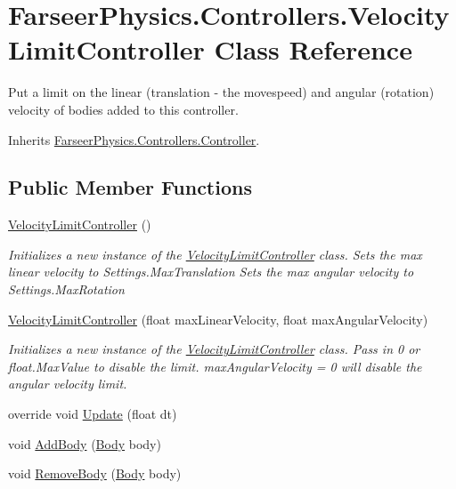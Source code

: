 \hypertarget{class_farseer_physics_1_1_controllers_1_1_velocity_limit_controller}{\section{Farseer\+Physics.\+Controllers.\+Velocity\+Limit\+Controller Class Reference}
\label{class_farseer_physics_1_1_controllers_1_1_velocity_limit_controller}
}


Put a limit on the linear (translation -\/ the movespeed) and angular (rotation) velocity of bodies added to this controller.  




Inherits \hyperlink{class_farseer_physics_1_1_controllers_1_1_controller}{Farseer\+Physics.\+Controllers.\+Controller}.

\subsection*{Public Member Functions}
\begin{DoxyCompactItemize}
\item 
\hyperlink{class_farseer_physics_1_1_controllers_1_1_velocity_limit_controller_a01861100f75c7b55cbdabd5a36872f6f}{Velocity\+Limit\+Controller} ()
\begin{DoxyCompactList}\small\item\em Initializes a new instance of the \hyperlink{class_farseer_physics_1_1_controllers_1_1_velocity_limit_controller}{Velocity\+Limit\+Controller} class. Sets the max linear velocity to Settings.\+Max\+Translation Sets the max angular velocity to Settings.\+Max\+Rotation \end{DoxyCompactList}\item 
\hyperlink{class_farseer_physics_1_1_controllers_1_1_velocity_limit_controller_a2a34ee3ebd6b1c47ad0548a6a7513d9c}{Velocity\+Limit\+Controller} (float max\+Linear\+Velocity, float max\+Angular\+Velocity)
\begin{DoxyCompactList}\small\item\em Initializes a new instance of the \hyperlink{class_farseer_physics_1_1_controllers_1_1_velocity_limit_controller}{Velocity\+Limit\+Controller} class. Pass in 0 or float.\+Max\+Value to disable the limit. max\+Angular\+Velocity = 0 will disable the angular velocity limit. \end{DoxyCompactList}\item 
override void \hyperlink{class_farseer_physics_1_1_controllers_1_1_velocity_limit_controller_a9f06aad10ab9cd87954d9426a8a29a84}{Update} (float dt)
\item 
void \hyperlink{class_farseer_physics_1_1_controllers_1_1_velocity_limit_controller_a64b64dc9947dc0baa51f8227682b7cd2}{Add\+Body} (\hyperlink{class_farseer_physics_1_1_dynamics_1_1_body}{Body} body)
\item 
void \hyperlink{class_farseer_physics_1_1_controllers_1_1_velocity_limit_controller_ac78953ea2e1a8f4b1b6abf295e207be6}{Remove\+Body} (\hyperlink{class_farseer_physics_1_1_dynamics_1_1_body}{Body} body)
\end{DoxyCompactItemize}
